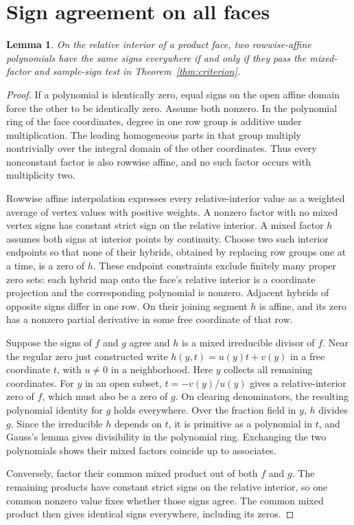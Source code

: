 \documentclass[11pt,a4paper]{amsart}
\newtheorem{lemma}[theorem]{Lemma}
\begin{document}
\section{Sign agreement on all faces}
\begin{lemma}\label{lem:sign}
On the relative interior of a product face, two rowwise-affine polynomials have the same signs everywhere if and only if they pass the mixed-factor and sample-sign test in Theorem~\ref{thm:criterion}.
\end{lemma}
\begin{proof}
If a polynomial is identically zero, equal signs on the open affine domain force the other to be identically zero. Assume both nonzero. In the polynomial ring of the face coordinates, degree in one row group is additive under multiplication. The leading homogeneous parts in that group multiply nontrivially over the integral domain of the other coordinates. Thus every nonconstant factor is also rowwise affine, and no such factor occurs with multiplicity two.

Rowwise affine interpolation expresses every relative-interior value as a weighted average of vertex values with positive weights. A nonzero factor with no mixed vertex signs has constant strict sign on the relative interior. A mixed factor $h$ assumes both signs at interior points by continuity. Choose two such interior endpoints so that none of their hybrids, obtained by replacing row groups one at a time, is a zero of $h$. These endpoint constraints exclude finitely many proper zero sets: each hybrid map onto the face's relative interior is a coordinate projection and the corresponding polynomial is nonzero. Adjacent hybrids of opposite signs differ in one row. On their joining segment $h$ is affine, and its zero has a nonzero partial derivative in some free coordinate of that row.

Suppose the signs of $f$ and $g$ agree and $h$ is a mixed irreducible divisor of $f$. Near the regular zero just constructed write $h(y,t)=u(y)t+v(y)$ in a free coordinate $t$, with $u\ne0$ in a neighborhood. Here $y$ collects all remaining coordinates. For $y$ in an open subset, $t=-v(y)/u(y)$ gives a relative-interior zero of $f$, which must also be a zero of $g$. On clearing denominators, the resulting polynomial identity for $g$ holds everywhere. Over the fraction field in $y$, $h$ divides $g$. Since the irreducible $h$ depends on $t$, it is primitive as a polynomial in $t$, and Gauss's lemma gives divisibility in the polynomial ring. Exchanging the two polynomials shows their mixed factors coincide up to associates.

Conversely, factor their common mixed product out of both $f$ and $g$. The remaining products have constant strict signs on the relative interior, so one common nonzero value fixes whether those signs agree. The common mixed product then gives identical signs everywhere, including its zeros.
\end{proof}
\end{document}
